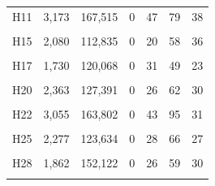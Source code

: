 \documentclass[
  a4paper,
  titlepage]{article}
\begin{document}
\begin{longtable}[t]{lllllll}
H11 & 3,173 & 167,515 & 0 & 47 & 79 & 38\\
 
\cellcolor{gray!6}{H13} & \cellcolor{gray!6}{1,959} & \cellcolor{gray!6}{147,460} & \cellcolor{gray!6}{0} & \cellcolor{gray!6}{29} & \cellcolor{gray!6}{49} & \cellcolor{gray!6}{20}\\
 
H15 & 2,080 & 112,835 & 0 & 20 & 58 & 36\\
 
\cellcolor{gray!6}{H16} & \cellcolor{gray!6}{2,039} & \cellcolor{gray!6}{142,114} & \cellcolor{gray!6}{0} & \cellcolor{gray!6}{27} & \cellcolor{gray!6}{53} & \cellcolor{gray!6}{19}\\
 
H17 & 1,730 & 120,068 & 0 & 31 & 49 & 23\\
 
\cellcolor{gray!6}{H18} & \cellcolor{gray!6}{2,375} & \cellcolor{gray!6}{151,884} & \cellcolor{gray!6}{0} & \cellcolor{gray!6}{26} & \cellcolor{gray!6}{60} & \cellcolor{gray!6}{29}\\
 
H20 & 2,363 & 127,391 & 0 & 26 & 62 & 30\\
 
\cellcolor{gray!6}{H21} & \cellcolor{gray!6}{2,622} & \cellcolor{gray!6}{142,388} & \cellcolor{gray!6}{0} & \cellcolor{gray!6}{30} & \cellcolor{gray!6}{75} & \cellcolor{gray!6}{38}\\
 
H22 & 3,055 & 163,802 & 0 & 43 & 95 & 31\\
 
\cellcolor{gray!6}{H23} & \cellcolor{gray!6}{2,363} & \cellcolor{gray!6}{123,796} & \cellcolor{gray!6}{0} & \cellcolor{gray!6}{26} & \cellcolor{gray!6}{65} & \cellcolor{gray!6}{26}\\
 
H25 & 2,277 & 123,634 & 0 & 28 & 66 & 27\\
 
\cellcolor{gray!6}{H26} & \cellcolor{gray!6}{1,875} & \cellcolor{gray!6}{134,502} & \cellcolor{gray!6}{0} & \cellcolor{gray!6}{33} & \cellcolor{gray!6}{56} & \cellcolor{gray!6}{25}\\
 
H28 & 1,862 & 152,122 & 0 & 26 & 59 & 30\\
 
\cellcolor{gray!6}{H30} & \cellcolor{gray!6}{2,842} & \cellcolor{gray!6}{169,191} & \cellcolor{gray!6}{0} & \cellcolor{gray!6}{38} & \cellcolor{gray!6}{76} & \cellcolor{gray!6}{34}\\
 

\end{longtable}
\end{document}

